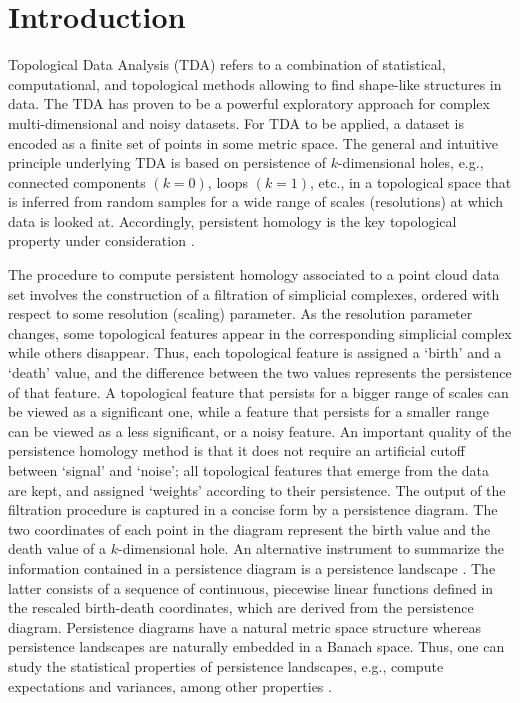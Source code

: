\documentclass[preprint,12pt]{elsarticle}
\theoremstyle{definition}
\theoremstyle{remark}
\numberwithin{equation}{section}
\theoremstyle{definition}
\begin{document}


\section{Introduction}
Topological Data Analysis (TDA) \cite{Carlsson09,Edelsbrunner10} refers to a combination of statistical, computational, and topological methods allowing to find shape-like structures in data. The TDA has proven  to be a powerful exploratory approach for complex multi-dimensional and noisy datasets. For TDA to be applied, a dataset is encoded as a finite set of points in some metric space. The general and intuitive principle underlying TDA is based on persistence of   $k$-dimensional holes, e.g., connected components $(k =0)$, loops $(k = 1)$, etc., in a topological space that is inferred from random samples for a wide range of scales (resolutions) at which data is looked at. Accordingly, persistent homology is the key topological property under consideration  \cite{Edelsbrunner02,Lum15}.

The procedure to compute persistent homology associated to a point cloud data set involves the construction of a filtration of simplicial complexes, ordered with respect to some resolution (scaling) parameter. As the resolution parameter changes, some topological features appear in the corresponding simplicial complex while others disappear. Thus, each topological feature is assigned a `birth' and a `death' value, and the difference between the two values represents the persistence of that feature. A topological feature that persists for a bigger range of scales can be viewed as a significant one, while a feature that persists for a smaller range can be viewed as a less significant, or a noisy feature. An important quality of the persistence homology method is that it does not require an artificial cutoff between `signal' and `noise'; all topological features that emerge from the data are kept, and assigned `weights' according to their persistence. The output of the filtration procedure is captured in a concise form by a persistence diagram. The two coordinates of each point in the diagram represent the birth value and the death value of a $k$-dimensional hole. An alternative instrument to summarize the information contained in a persistence diagram is a persistence landscape \cite{Bubenik15,Bubenik16}. The latter consists of a sequence of continuous, piecewise linear functions defined in the rescaled birth-death coordinates, which are derived from the persistence diagram. Persistence diagrams have a natural metric space structure whereas persistence landscapes are naturally embedded in a Banach space. Thus, one can study the statistical properties of persistence landscapes, e.g., compute expectations and variances, among other properties  \cite{Bubenik15,Chazal2015}.
\end{document}
